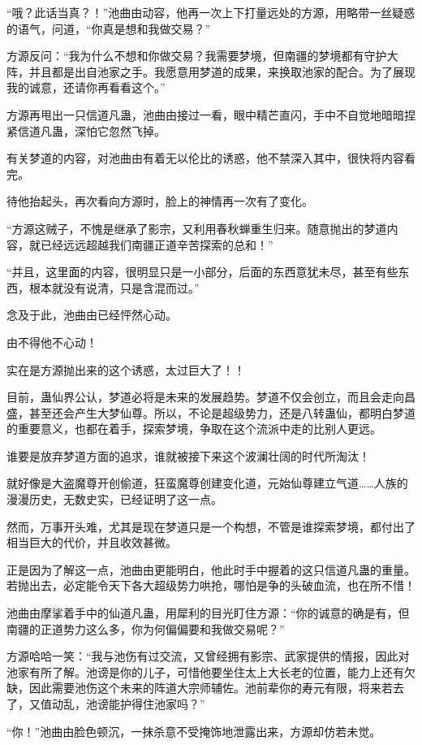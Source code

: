 \begin{this_body}
“哦？此话当真？！”池曲由动容，他再一次上下打量远处的方源，用略带一丝疑惑的语气，问道，“你真是想和我做交易？”

方源反问：“我为什么不想和你做交易？我需要梦境，但南疆的梦境都有守护大阵，并且都是出自池家之手。我愿意用梦道的成果，来换取池家的配合。为了展现我的诚意，还请你再看看这个。”

方源再甩出一只信道凡蛊，池曲由接过一看，眼中精芒直闪，手中不自觉地暗暗捏紧信道凡蛊，深怕它忽然飞掉。

有关梦道的内容，对池曲由有着无以伦比的诱惑，他不禁深入其中，很快将内容看完。

待他抬起头，再次看向方源时，脸上的神情再一次有了变化。

“方源这贼子，不愧是继承了影宗，又利用春秋蝉重生归来。随意抛出的梦道内容，就已经远远超越我们南疆正道辛苦探索的总和！”

“并且，这里面的内容，很明显只是一小部分，后面的东西意犹未尽，甚至有些东西，根本就没有说清，只是含混而过。”

念及于此，池曲由已经怦然心动。

由不得他不心动！

实在是方源抛出来的这个诱惑，太过巨大了！！

目前，蛊仙界公认，梦道必将是未来的发展趋势。梦道不仅会创立，而且会走向昌盛，甚至还会产生大梦仙尊。所以，不论是超级势力，还是八转蛊仙，都明白梦道的重要意义，也都在着手，探索梦境，争取在这个流派中走的比别人更远。

谁要是放弃梦道方面的追求，谁就被接下来这个波澜壮阔的时代所淘汰！

就好像是大盗魔尊开创偷道，狂蛮魔尊创建变化道，元始仙尊建立气道……人族的漫漫历史，无数史实，已经证明了这一点。

然而，万事开头难，尤其是现在梦道只是一个构想，不管是谁探索梦境，都付出了相当巨大的代价，并且收效甚微。

正是因为了解这一点，池曲由更能明白，他此时手中握着的这只信道凡蛊的重量。若抛出去，必定能令天下各大超级势力哄抢，哪怕是争的头破血流，也在所不惜！

池曲由摩挲着手中的仙道凡蛊，用犀利的目光盯住方源：“你的诚意的确是有，但南疆的正道势力这么多，你为何偏偏要和我做交易呢？”

方源哈哈一笑：“我与池伤有过交流，又曾经拥有影宗、武家提供的情报，因此对池家有所了解。池谤是你的儿子，可惜他要坐住太上大长老的位置，能力上还有欠缺，因此需要池伤这个未来的阵道大宗师辅佐。池前辈你的寿元有限，将来若去了，又值动乱，池谤能护得住池家吗？”

“你！”池曲由脸色顿沉，一抹杀意不受掩饰地泄露出来，方源却仿若未觉。


\end{this_body}
